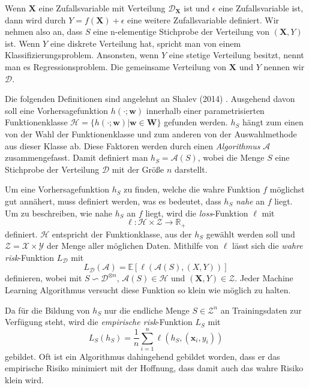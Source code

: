 Wenn $\mathbf{X}$ eine Zufallsvariable mit Verteilung $\mathcal{D}_{\mathbf{X}}$ ist und $\epsilon$ eine Zufallsvariable ist, dann wird durch
$Y = f(\mathbf{X}) + \epsilon$ eine weitere Zufallsvariable definiert. Wir nehmen also an, dass $S$ eine n-elementige Stichprobe der Verteilung
von $(\mathbf{X},Y)$ ist. Wenn $Y$ eine diskrete Verteilung hat, spricht man von einem Klassifizierungsproblem. Ansonsten, wenn $Y$ eine stetige Verteilung besitzt,
nennt man es Regressionsproblem.
Die gemeinsame Verteilung von $\mathbf{X}$ und $Y$ nennen wir $\mathcal{D}$.

Die folgenden Definitionen sind angelehnt an Shalev (2014) \cite[Seiten 33 bis 35]{shalev}.
Ausgehend davon soll eine Vorhersagefunktion $h(\cdot;\mathbf{w})$ innerhalb einer parametrisierten Funktionenklasse $\mathcal{H} = \{ h(\cdot; \mathbf{w})
	|\mathbf{w} \in \mathbf{W}\}$ gefunden werden. $h_S$ h\"angt zum einen von der Wahl der Funktionenklasse und zum anderen von der Auswahlmethode aus dieser Klasse ab.
Diese Faktoren werden durch einen \textit{Algorithmus} $\mathcal{A}$ zusammengefasst. Damit definiert man $h_S = \mathcal{A}(S)$, wobei die Menge $S$ eine
Stichprobe der Verteilung $\mathcal{D}$ mit der Gr\"o{\ss}e $n$ darstellt.

Um eine Vorhersagefunktion $h_S$ zu finden, welche die wahre Funktion $f$ m\"oglichst gut ann\"ahert, muss definiert werden, was es bedeutet, dass
$h_S$ \textit{nahe} an $f$ liegt. 
Um zu beschreiben, wie nahe $h_S$ an $f$ liegt, wird die \textit{loss}-Funktion $\ell$ mit
$$ \ell : \mathcal{H} \times \mathcal{Z} \to \mathbb{R}_+ $$
definiert. $\mathcal{H}$ entspricht der Funktionklasse, aus der $h_S$ gew\"ahlt werden soll und $\mathcal{Z} =
	\mathcal{X} \times \mathcal{Y}$ der Menge aller m\"oglichen Daten. Mithilfe von $\ell$ l\"asst sich die \textit{wahre risk}-Funktion $L_{\mathcal{D}}$ mit
$$ L_{\mathcal{D}}(\mathcal{A}) = \mathbb{E}[\ell(\mathcal{A}(S), (X,Y))]$$
definieren, wobei mit $S \backsim \mathcal{D}^{\otimes n}$, $\mathcal{A}(S) \in \mathcal{H}$ und $(\mathbf{X},Y) \in \mathcal{Z}$. Jeder Machine Learning Algorithmus versucht diese Funktion so klein wie m\"oglich zu halten.

Da f\"ur die Bildung von $h_S$ nur die endliche Menge $S\in\mathcal{Z}^n$ an Trainingsdaten zur Verf\"ugung steht, wird die
\textit{empirische risk}-Funktion $L_S$ mit
$$ L_S(h_S) = \frac{1}{n}\sum_{i=1}^n \ell(h_S, (\mathbf{x}_i,y_i))$$
gebildet. Oft ist ein Algorithmus dahingehend gebildet worden, dass er das empirische Risiko minimiert mit der Hoffnung, dass damit auch das wahre Risiko klein wird.


